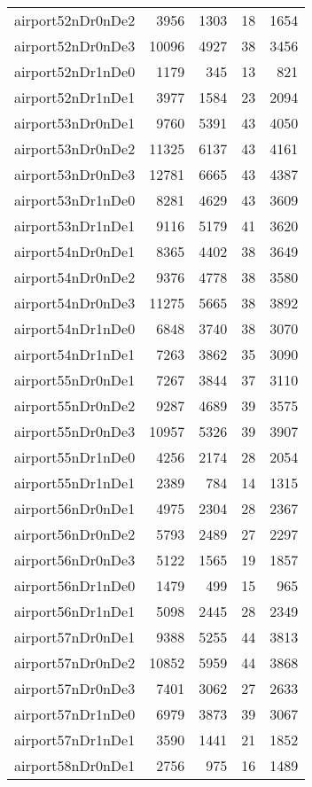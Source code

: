 \begin{longtable}{lrrrr}
airport52nDr0nDe2 & 3956 & 1303 & 18 & 1654 \\
airport52nDr0nDe3 & 10096 & 4927 & 38 & 3456 \\
airport52nDr1nDe0 & 1179 & 345 & 13 & 821 \\
airport52nDr1nDe1 & 3977 & 1584 & 23 & 2094 \\
airport53nDr0nDe1 & 9760 & 5391 & 43 & 4050 \\
airport53nDr0nDe2 & 11325 & 6137 & 43 & 4161 \\
airport53nDr0nDe3 & 12781 & 6665 & 43 & 4387 \\
airport53nDr1nDe0 & 8281 & 4629 & 43 & 3609 \\
airport53nDr1nDe1 & 9116 & 5179 & 41 & 3620 \\
airport54nDr0nDe1 & 8365 & 4402 & 38 & 3649 \\
airport54nDr0nDe2 & 9376 & 4778 & 38 & 3580 \\
airport54nDr0nDe3 & 11275 & 5665 & 38 & 3892 \\
airport54nDr1nDe0 & 6848 & 3740 & 38 & 3070 \\
airport54nDr1nDe1 & 7263 & 3862 & 35 & 3090 \\
airport55nDr0nDe1 & 7267 & 3844 & 37 & 3110 \\
airport55nDr0nDe2 & 9287 & 4689 & 39 & 3575 \\
airport55nDr0nDe3 & 10957 & 5326 & 39 & 3907 \\
airport55nDr1nDe0 & 4256 & 2174 & 28 & 2054 \\
airport55nDr1nDe1 & 2389 & 784 & 14 & 1315 \\
airport56nDr0nDe1 & 4975 & 2304 & 28 & 2367 \\
airport56nDr0nDe2 & 5793 & 2489 & 27 & 2297 \\
airport56nDr0nDe3 & 5122 & 1565 & 19 & 1857 \\
airport56nDr1nDe0 & 1479 & 499 & 15 & 965 \\
airport56nDr1nDe1 & 5098 & 2445 & 28 & 2349 \\
airport57nDr0nDe1 & 9388 & 5255 & 44 & 3813 \\
airport57nDr0nDe2 & 10852 & 5959 & 44 & 3868 \\
airport57nDr0nDe3 & 7401 & 3062 & 27 & 2633 \\
airport57nDr1nDe0 & 6979 & 3873 & 39 & 3067 \\
airport57nDr1nDe1 & 3590 & 1441 & 21 & 1852 \\
airport58nDr0nDe1 & 2756 & 975 & 16 & 1489 \\

\end{longtable}
